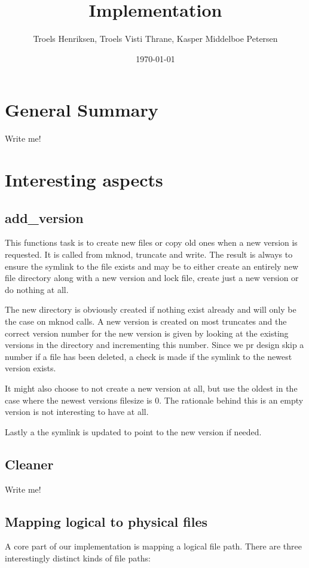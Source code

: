 \documentclass[12pt]{article}
\author{
        Troels Henriksen, Troels Visti Thrane, Kasper Middelboe Petersen
}
\date{\today}
\title{Implementation}
\begin{document}
 
\maketitle

\section{General Summary}
Write me!

\section{Interesting aspects}

\subsection{add\_version}

This functions task is to create new files or copy old ones when a new
version is requested. It is called from mknod, truncate and write. The
result is always to ensure the symlink to the file exists and may be
to either create an entirely new file directory along with a new
version and lock file, create just a new version or do nothing at all.

The new directory is obviously created if nothing exist already and
will only be the case on mknod calls. A new version is created on most
truncates and the correct version number for the new version is given
by looking at the existing versions in the directory and incrementing
this number. Since we pr design skip a number if a file has been
deleted, a check is made if the symlink to the newest version exists.

It might also choose to not create a new version at all, but use the
oldest in the case where the newest versions filesize is 0. The
rationale behind this is an empty version is not interesting to have
at all.

Lastly a the symlink is updated to point to the new version if needed.

\subsection{Cleaner}
Write me!

\subsection{Mapping logical to physical files}

A core part of our implementation is mapping a logical file path.
There are three interestingly distinct kinds of file paths:
\end{document}
